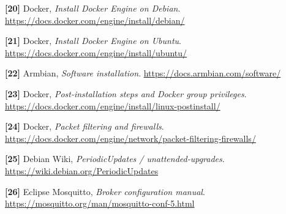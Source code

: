 \documentclass[10pt,oneside,openany]{report}
\begin{document}
\noindent\textbf{[20]} Docker, \emph{Install Docker Engine on Debian}. \url{https://docs.docker.com/engine/install/debian/}

\noindent\textbf{[21]} Docker, \emph{Install Docker Engine on Ubuntu}. \url{https://docs.docker.com/engine/install/ubuntu/}

\noindent\textbf{[22]} Armbian, \emph{Software installation}. \url{https://docs.armbian.com/software/}

\noindent\textbf{[23]} Docker, \emph{Post-installation steps and Docker group privileges}. \url{https://docs.docker.com/engine/install/linux-postinstall/}

\noindent\textbf{[24]} Docker, \emph{Packet filtering and firewalls}. \url{https://docs.docker.com/engine/network/packet-filtering-firewalls/}

\noindent\textbf{[25]} Debian Wiki, \emph{PeriodicUpdates / unattended-upgrades}. \url{https://wiki.debian.org/PeriodicUpdates}

\noindent\textbf{[26]} Eclipse Mosquitto, \emph{Broker configuration manual}. \url{https://mosquitto.org/man/mosquitto-conf-5.html}
\endgroup
\end{document}

